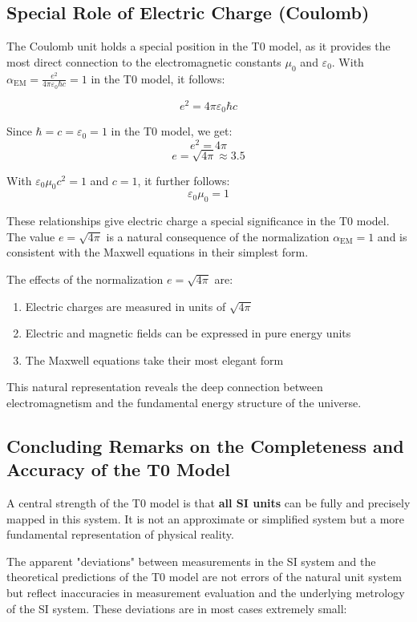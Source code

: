 \documentclass[12pt,a4paper]{article}
\newcommand{\alphaEM}{\alpha_{\text{EM}}}
\begin{document}
	\subsection*{Special Role of Electric Charge (Coulomb)}
	
	The Coulomb unit holds a special position in the T0 model, as it provides the most direct connection to the electromagnetic constants $\mu_0$ and $\varepsilon_0$. With $\alphaEM = \frac{e^2}{4\pi\varepsilon_0\hbar c} = 1$ in the T0 model, it follows:
	
	\[
	e^2 = 4\pi\varepsilon_0\hbar c
	\]
	
	Since $\hbar = c = \varepsilon_0 = 1$ in the T0 model, we get:
	\[
	e^2 = 4\pi
	\]
	\[
	e = \sqrt{4\pi} \approx 3.5
	\]
	
	With $\varepsilon_0\mu_0c^2 = 1$ and $c = 1$, it further follows:
	\[
	\varepsilon_0\mu_0 = 1
	\]
	
	These relationships give electric charge a special significance in the T0 model. The value $e = \sqrt{4\pi}$ is a natural consequence of the normalization $\alphaEM = 1$ and is consistent with the Maxwell equations in their simplest form.
	
	The effects of the normalization $e = \sqrt{4\pi}$ are:
	\begin{enumerate}
		\item Electric charges are measured in units of $\sqrt{4\pi}$
		\item Electric and magnetic fields can be expressed in pure energy units
		\item The Maxwell equations take their most elegant form
	\end{enumerate}
	
	This natural representation reveals the deep connection between electromagnetism and the fundamental energy structure of the universe.
	
	\subsection*{Concluding Remarks on the Completeness and Accuracy of the T0 Model}
	
	A central strength of the T0 model is that \textbf{all SI units} can be fully and precisely mapped in this system. It is not an approximate or simplified system but a more fundamental representation of physical reality.
	
	The apparent "deviations" between measurements in the SI system and the theoretical predictions of the T0 model are not errors of the natural unit system but reflect inaccuracies in measurement evaluation and the underlying metrology of the SI system. These deviations are in most cases extremely small:
	
\end{document}
